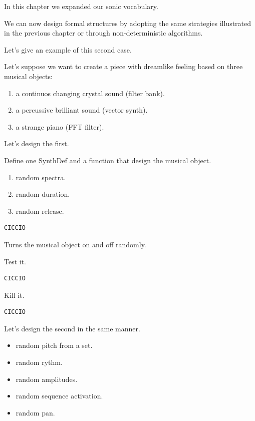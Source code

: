 In this chapter we expanded our sonic vocabulary.

We can now design formal structures by adopting the same strategies illustrated in the previous chapter or through non-deterministic algorithms.

Let's give an example of this second case.

Let's suppose we want to create a piece with dreamlike feeling based on three musical objects:

\begin{enumerate}
\def\labelenumi{\arabic{enumi}.}
\setcounter{enumi}{1}
\tightlist
\item a continuos changing crystal sound (filter bank). 
\item a percussive brilliant sound (vector synth). 
\item a strange piano (FFT filter).
\end{enumerate}

Let's design the first.

Define one SynthDef and a function that design the musical object.
\begin{enumerate}
\tightlist
\item random spectra.
\item random duration.
\item random release.
\end{enumerate}

\begin{lstlisting}[frame=single] 
CICCIO
\end{lstlisting}

Turns the musical object on and off randomly.

Test it.

\begin{lstlisting}[frame=single] 
CICCIO
\end{lstlisting}

Kill it.

\begin{lstlisting}[frame=single] 
CICCIO
\end{lstlisting}

Let's design the second in the same manner.

\begin{itemize}
\tightlist
\item random pitch from a set.
\item random rythm.
\item random amplitudes.
\item random sequence activation.
\item random pan.
\end{itemize}

